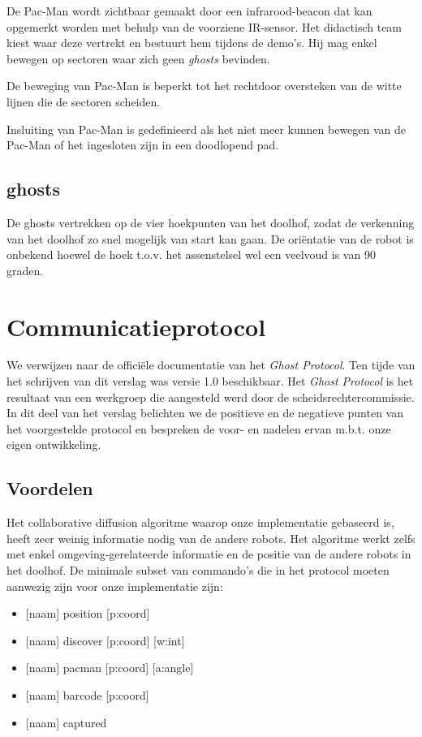 \documentclass[12pt,a4paper]{report}
\begin{document}
De Pac-Man wordt zichtbaar gemaakt door een infrarood-beacon dat kan opgemerkt worden met behulp van de voorziene IR-sensor. Het didactisch team kiest waar deze vertrekt en bestuurt hem tijdens de demo's. Hij mag enkel bewegen op sectoren waar zich geen \emph{ghosts} bevinden.

De beweging van Pac-Man is beperkt tot het rechtdoor oversteken van de witte lijnen die de sectoren scheiden.

Insluiting van Pac-Man is gedefinieerd als het niet meer kunnen bewegen van de Pac-Man of het ingesloten zijn in een doodlopend pad.

\subsection{ghosts}

De ghosts vertrekken op de vier hoekpunten van het doolhof, zodat de verkenning van het doolhof zo snel mogelijk van start kan gaan. De ori\"entatie van de robot is onbekend hoewel de hoek t.o.v. het assenstelsel wel een veelvoud is van 90 graden.


\section{Communicatieprotocol}

We verwijzen naar de offici\"ele documentatie van het \emph{Ghost Protocol}. Ten tijde van het schrijven van dit verslag was versie 1.0 beschikbaar. Het \emph{Ghost Protocol} is het resultaat van een werkgroep die aangesteld werd door de scheidsrechtercommissie. In dit deel van het verslag belichten we de positieve en de negatieve punten van het voorgestelde protocol en bespreken de voor- en nadelen ervan m.b.t. onze eigen ontwikkeling.

\subsection{Voordelen}

Het collaborative diffusion algoritme waarop onze implementatie gebaseerd is, heeft zeer weinig informatie nodig van de andere robots. Het algoritme werkt zelfs met enkel omgeving-gerelateerde informatie en de positie van de andere robots in het doolhof. De minimale subset van commando's die in het protocol moeten aanwezig zijn voor onze implementatie zijn:

\begin{itemize}
	\item{ [naam] position [p:coord]}
	\item{ [naam] discover [p:coord] [w:int]}
	\item{ [naam] pacman [p:coord] [a:angle]}
	\item{ [naam] barcode [p:coord] }
	\item{ [naam] captured }
\end{itemize}
\end{document}

